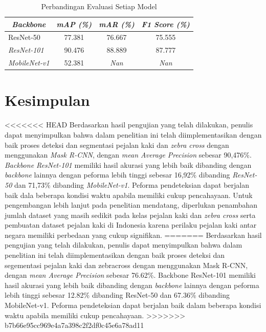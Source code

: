 \documentclass[conference]{IEEEtran}
\begin{document}
	\vspace{1ex}
	\begin{table}[h]
		\caption{Perbandingan Evaluasi Setiap Model}
		\centering
		\begin{tabular}{|l|c|c|c|}
			\hline
			\multicolumn{1}{|c|}{\textit{\textbf{Backbone}}} & \textit{\textbf{mAP (\%)}} & \textit{\textbf{mAR (\%)}} & \textit{\textbf{F1 Score (\%)}} \\ \hline
			ResNet-50                                        & 77.381                     & 76.667                         & 75.555                          \\ \hline
			\textit{ResNet-101}                              & 90.476                     & 88.889                     & 87.777                          \\ \hline
			\textit{MobileNet-v1}                            & 52.381                         & \textit{Nan}                        & \textit{Nan}                             \\ \hline
		\end{tabular}
		\label{tab:result}
	\end{table}
	
	\section{Kesimpulan}
	\vspace{1ex}
<<<<<<< HEAD
	Berdasarkan hasil pengujian yang telah dilakukan, penulis dapat menyimpulkan bahwa dalam penelitian ini telah diimplementasikan dengan baik proses deteksi dan segmentasi pejalan kaki dan \textit{zebra cross} dengan menggunakan \textit{Mask R-CNN}, dengan \textit{mean Average Precision} sebesar 90,476\%. \textit{Backbone ResNet-101} memiliki hasil akurasi yang lebih baik
	dibanding dengan \textit{backbone} lainnya dengan peforma lebih tinggi sebesar 16,92\% dibanding \textit{ResNet-50} dan 71,73\% dibanding \textit{MobileNet-v1}. Peforma pendeteksian dapat berjalan baik dala beberapa kondisi waktu apabila memiliki cukup pencahayaan. Untuk pengembangan lebih lanjut pada penelitian mendatang, diperlukan penambahan jumlah dataset yang masih sedikit pada kelas pejalan kaki dan \textit{zebra cross} serta pembuatan dataset pejalan kaki di Indonesia karena perilaku pejalan kaki antar negara memiliki perbedaan yang cukup
	signifikan.
=======
	Berdasarkan hasil pengujian yang telah dilakukan, penulis dapat menyimpulkan bahwa dalam penelitian ini telah diimplementasikan dengan baik proses deteksi dan segementasi pejalan kaki dan zebracross dengan menggunakan Mask R-CNN, dengan \textit{mean Average Precision} sebesar 76.62\%. {Backbone} ResNet-101 memiliki hasil akurasi yang lebih baik dibanding dengan \textit{backbone} lainnya dengan peforma lebih tinggi sebesar 12.82\% dibanding ResNet-50 dan 67.36\% dibanding MobileNet-v1. Peforma pendeteksian dapat berjalan baik dalam beberapa kondisi waktu apabila memiliki cukup pencahayaan. 
>>>>>>> b7b66e95cc969e4a7a398c2f2df0c45e6a78ad11
	
	
	
\end{document}

